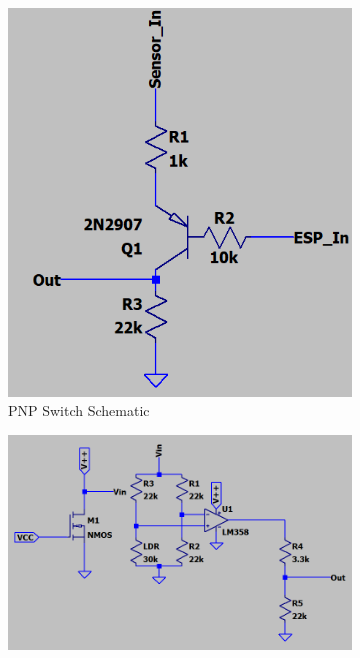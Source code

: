 \documentclass[class=report,11pt,crop=false]{standalone}
\begin{document}
\begin{figure}[hbt!]
    \begin{subfigure}[b]{0.25\textwidth}
        \includegraphics[width=\linewidth]{Images/Switch_circuit.png}
        \caption{PNP Switch Schematic}
        \label{fig:PNP_Switch}
    \end{subfigure}
    \hfill
    \begin{subfigure}[b]{0.4\textwidth}
        \includegraphics[width=\linewidth]{Images/LDR_circuit.png}

\end{subfigure}
\end{figure}
\end{document}

